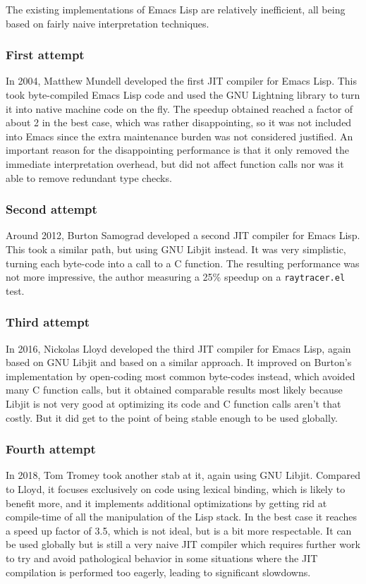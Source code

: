 \documentclass[format=acmsmall, review]{acmart}
\newcommand \Elisp {Emacs Lisp}
\begin{document}
The existing implementations of \Elisp{} are relatively inefficient, all
being based on fairly naive interpretation techniques.

\subsubsection{First attempt}
In 2004, Matthew Mundell developed the first JIT compiler for \Elisp.
This took byte-compiled \Elisp{} code and used the GNU Lightning library to
turn it into native machine code on the fly.
The speedup obtained reached a factor of about 2 in the best case, which
was rather disappointing, so it was not included into Emacs since the extra
maintenance burden was not considered justified.
An important reason for the disappointing performance is that it only
removed the immediate interpretation overhead, but did not affect function
calls nor was it able to remove redundant type checks.

\subsubsection{Second attempt}
Around 2012, Burton Samograd developed a second JIT compiler for \Elisp.
This took a similar path, but using GNU Libjit instead.  It was very
simplistic, turning each byte-code into a call to a C function.
The resulting performance was not more impressive, the author measuring
a 25\% speedup on a \texttt{raytracer.el} test.

\subsubsection{Third attempt}
In 2016, Nickolas Lloyd developed the third JIT compiler for \Elisp, again
based on GNU Libjit and based on a similar approach.  It improved on
Burton's implementation by open-coding most common byte-codes instead, which
avoided many C function calls, but it obtained comparable results most
likely because Libjit is not very good at optimizing its code and C function
calls aren't that costly.  But it did get to the point of being stable enough
to be used globally.

\subsubsection{Fourth attempt}
In 2018, Tom Tromey took another stab at it, again using GNU Libjit.
Compared to Lloyd, it focuses exclusively on code using lexical binding,
which is likely to benefit more, and it implements additional optimizations
by getting rid at compile-time of all the manipulation of the Lisp stack.
In the best case it reaches a speed up factor of 3.5, which is not ideal,
but is a bit more respectable.  It can be used globally but is still
a very naive JIT compiler which requires further work to try and avoid
pathological behavior in some situations where the JIT compilation is
performed too eagerly, leading to significant slowdowns.
\end{document}
